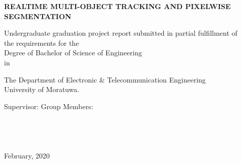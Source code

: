 \begin{titlepage}
  \vspace{1 in}
  \begin{center}
    \large{
    \MakeUppercase{\textbf{Realtime Multi-Object Tracking and Pixelwise Segmentation}}}\\
    \vspace{1.5 in}
    
    \normalsize
    Undergraduate graduation project report submitted in partial fulfillment of \\
    the requirements for the
\\
    Degree of Bachelor of Science of Engineering \\                                          
    in
\\
    
    \vspace{5mm}
    
    The Department of Electronic \& Telecommunication Engineering
 \\
    University of Moratuwa.
\\
    
    \vspace{50mm}
    
	Supervisor:	 	\hfill  	Group Members: \\
    \supervisorA \hfill 	\indexA \\
    \supervisorB \hfill 	\indexB \\
    					  \hfill 	 \indexC \\
   						  \hfill 	 \indexD \\
    
    \vspace{40mm}
    February, 2020\\

  \end{center}
\end{titlepage}
